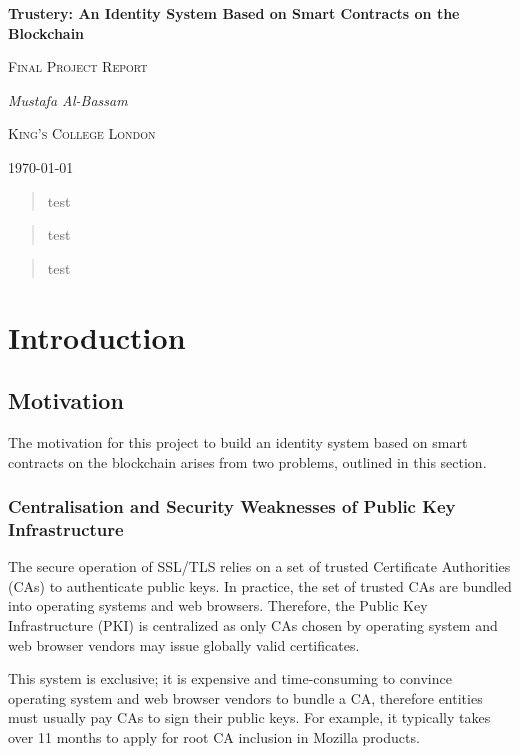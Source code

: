 \documentclass[a4paper]{report}
\newenvironment{originality}
	{\renewcommand{\abstractname}{Originality Avowal}
		\begin{abstract}}
	{\end{abstract}
		\clearpage}
\newenvironment{acknowledgements}
	{\renewcommand{\abstractname}{Acknowledgements}
		\begin{abstract}}
	{\end{abstract}
		\clearpage}
\begin{document}
	\begin{titlepage}
		\centering
		{\huge\bfseries Trustery: An Identity System Based on Smart Contracts on the Blockchain\par}
		\vspace{1cm}
		{\Large\scshape Final Project Report\par}
		\vspace{1.5cm}
		{\Large\itshape Mustafa Al-Bassam\par}
		\vfill
		{\LARGE\scshape King's College London\par}
		\vfill
		{\large \today\par}
	\end{titlepage}
	
	\begin{abstract}
		test
	\end{abstract}
	
	\begin{acknowledgements}
		test
	\end{acknowledgements}
	
	\begin{originality}
		test
	\end{originality}
	
	\tableofcontents
	
	\chapter{Introduction}
	\section{Motivation}
	The motivation for this project to build an identity system based on smart contracts on the blockchain arises from two problems, outlined in this section.
	
	\subsection{Centralisation and Security Weaknesses of Public Key Infrastructure}
	The secure operation of SSL/TLS relies on a set of trusted Certificate Authorities (CAs) to authenticate public keys\cite{1}. In practice, the set of trusted CAs are bundled into operating systems and web browsers. Therefore, the Public Key Infrastructure (PKI) is centralized as only CAs chosen by operating system and web browser vendors may issue globally valid certificates.

	This system is exclusive; it is expensive and time-consuming to convince operating system and web browser vendors to bundle a CA, therefore entities must usually pay CAs to sign their public keys. For example, it typically takes over 11 months to apply for root CA inclusion in Mozilla products\cite{6}.
	 
\end{document}
